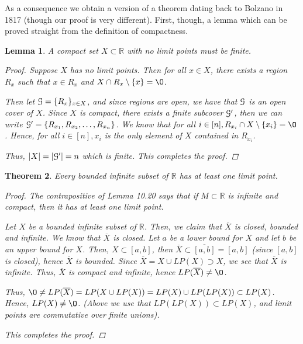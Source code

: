 \documentclass[11pt]{article}
\newcommand{\bbR}{\mathbb{R}}
\renewcommand{\emptyset}{\O}
\renewcommand{\_}[1]{\underline{ #1 }}
\newtheorem{theorem}{Theorem}[section]
\newtheorem{lemma}[theorem]{Lemma}
\theoremstyle{definition}
\numberwithin{equation}{subsection}
\begin{document}
As a consequence we obtain a version of a theorem dating back to Bolzano in 1817 (though our proof is very different).  First, though, a lemma which can be proved straight from the definition of compactness.

\begin{lemma}
A compact set $X \subset \bbR$ with no limit points must be finite.

\begin{proof}
Suppose $X$ has no limit points. Then for all $x \in X$, there exists a region $R_x$ such that $x\in R_x$ and $X \cap R_x \setminus \{x\} = \emptyset$.  

Then let $\mathcal G = \{R_x\}_{x \in X}$, and since regions are open, we have that $\mathcal G$ is an open cover of $X$. Since $X$ is compact, there exists a finite subcover $\mathcal G'$, then we can write $\mathcal G'=\{R_{x_1}, R_{x_2}, \dots, R_{x_n}\}$. We know that for all $i\in [n], R_{x_i} \cap X \setminus \{x_i\} = \emptyset$. Hence, for all $i \in [n], x_i$ is the only element of $X$ contained in $R_{x_i}$. 

Thus, $|X|=|\mathcal G'|=n$ which is finite. This completes the proof.

\renewcommand\qedsymbol{QED}
\end{proof}


\end{lemma}

\begin{theorem} Every bounded infinite subset of $\bbR$ has at least one limit point.

\begin{proof}
The contrapositive of Lemma 10.20 says that if $M \subset \bbR$ is infinite and compact, then it has at least one limit point. 

Let $X$ be a bounded infinite subset of $\bbR$. Then, we claim that $\overline{X}$ is closed, bounded and infinite. We know that $\overline{X}$ is closed. Let $a$ be a lower bound for $X$ and let $b$ be an upper bound for $X$. Then, $X \subset [a,b]$, then $\overline{X} \subset \overline{[a,b]}=[a,b]$ (since $[a,b]$ is closed), hence $\overline{X}$ is bounded. Since $\overline{X}=X \cup LP(X) \supset X$, we see that $\overline{X}$ is infinite. Thus, $\overline{X}$ is compact and infinite, hence $LP(\overline{X}) \neq \emptyset$.

Thus, $\emptyset \neq LP(\overline{X}) = LP(X \cup LP(X)) = LP(X) \cup LP(LP(X)) \subset LP(X)$. Hence, $LP(X) \neq \emptyset$. (Above we use that $LP(LP(X)) \subset LP(X)$, and limit points are commutative over finite unions). 

This completes the proof.


\renewcommand\qedsymbol{QED}
\end{proof}


\end{theorem}
\end{document}
